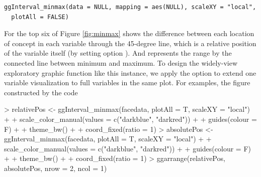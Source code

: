 \documentclass[article]{jss}
\begin{document}
\begin{verbatim}
ggInterval_minmax(data = NULL, mapping = aes(NULL), scaleXY = "local",
  plotAll = FALSE)
\end{verbatim}

For the top six of Figure \ref{fig:minmax} shows the difference between each location of concept in each variable through the 45-degree line, which is a relative position of the variable itself (by setting option ). And represents the range by the connected line between minimum and maximum. To design the widely-view exploratory graphic function like this instance, we apply the option  to extend one variable visualization to full variables in the same plot. For examples, the figure constructed by the code

\begin{Schunk}
\begin{Sinput}
> relativePos <- ggInterval_minmax(facedata, plotAll = T, scaleXY = "local") +
+                scale_color_manual(values = c("darkblue", "darkred")) +
+                guides(colour = F) + 
+                theme_bw() + 
+                coord_fixed(ratio = 1)
> absolutePos <- ggInterval_minmax(facedata, plotAll = T, scaleXY = "local") +
+                scale_color_manual(values = c("darkblue", "darkred")) +
+                guides(colour = F) + 
+                theme_bw() + 
+                coord_fixed(ratio = 1)
> ggarrange(relativePos, absolutePos, nrow = 2, ncol = 1)
\end{Sinput}
\end{Schunk}
\end{document}
